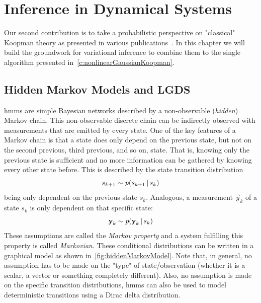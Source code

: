 \chapter{Inference in Dynamical Systems}
\label{c:inferenceInDynamicalSystems}



Our second contribution is to take a probabilistic perspective on "classical" Koopman theory as presented in various publications~\cite{bruntonKoopmanInvariantSubspaces2016,hanDeepLearningKoopman2020,kaiserDatadrivenDiscoveryKoopman2020,luschDeepLearningUniversal2018,williamsDataDrivenApproximation2015}. In this chapter we will build the groundwork for variational inference to combine them to the single \algname algorithm presented in~\autoref{c:nonlinearGaussianKoopman}.

\section{Hidden Markov Models and LGDS}
	\acp{hmm} are simple Bayesian networks described by a non-observable (\emph{hidden}) Markov chain. This non-observable discrete chain can be indirectly observed with measurements that are emitted by every state. One of the key features of a Markov chain is that a state does only depend on the previous state, but not on the second previous, third previous, and so on, state. That is, knowing only the previous state is sufficient and no more information can be gathered by knowing every other state before. This is described by the state transition distribution
	\begin{equation*}
		s_{k + 1} \sim p(s_{k + 1} \,\vert\, s_k)
	\end{equation*}
	being only dependent on the previous state \(s_k\). Analogous, a measurement \(\vec{y}_k\) of a state \(s_k\) is only dependent on that specific state:
	\begin{equation*}
		\boldsymbol{\mathrm{y}}_k \sim p(\boldsymbol{\mathrm{y}}_k \,\vert\, s_k)
	\end{equation*}
	These assumptions are called the \emph{Markov property} and a system fulfilling this property is called \emph{Markovian}. These conditional distributions can be written in a graphical model as shown in~\autoref{fig:hiddenMarkovModel}. Note that, in general, no assumption has to be made on the "type" of state/observation (\ie whether it is a scalar, a vector or something completely different). Also, no assumption is made on the specific transition distributions, \acp{hmm} can also be used to model deterministic transitions using a Dirac delta distribution.

